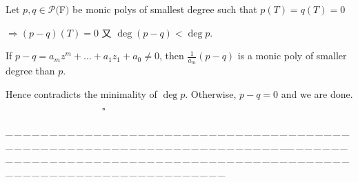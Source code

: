\documentclass[a4paper, 11pt, UTF8]{article}
\def\Po{\mathcal{P}}
\begin{document}
\begin{large}
Let $p,q\in\Po(${\timesbf F}$)$ be monic polys of smallest degree such that $p(T)=q(T) = 0$\par\quad
$\Rightarrow (p-q)(T)=0$ 又 $\deg(p-q)<\deg p$.\par\quad
If $p - q=a_m z^m+\dots+a_1 z_1 +a_0\neq 0$, then $\frac{1}{a_m}(p-q)$ is a monic poly of smaller degree than $p$. \par\quad
Hence contradicts the minimality of $\deg p$. Otherwise, $p-q=0$ and we are done.$\qquad\qquad\qquad\qquad\qquad\square$\par
{\tiny \_\,\_\,\_\,\_\,\_\,\_\,\_\,\_\,\_\,\_\,\_\,\_\,\_\,\_\,\_\,\_\,\_\,\_\,\_\,\_\,\_\,\_\,\_\,\_\,\_\,\_\,\_\,\_\,\_\,\_\,\_\,\_\,\_\,\_\,\_\,\_\,\_\,\_\,\_\,\_\,\_\,\_\,\_\,\_\,\_\,\_\,\_\,\_\,\_\,\_\,\_\,\_\,\_\,\_\,\_\,\_\,\_\,\_\,\_\,\_\,\_\,\_\,\_\,\_\,\_\,\_\,\_\,\_\,\_\,\_\,\_\_\,\_\,\_\,\_\,\_\,\_\,\_\,\_\,\_\,\_\,\_\,\_\,\_\,\_\,\_\,\_\,\_\,\_\,\_\,\_\,\_\,\_\,\_\,\_\,\_\,\_\,\_\,\_\,\_\,\_\,\_\,\_\,\_\,\_\,\_\,\_\,\_\,\_\,\_\,\_\,\_\,\_\,\_\,\_\,\_\,\_\,\_\,\_\,\_\,\_\,\_\,\_\,\_\,\_\,\_\,\_\,\_\,\_\,\_\,\_\,\_\,\_\,\_\,\_\,\_\,\_\,\_\,\_\,\_\,\_\,\_}\par


\end{large}
\end{document}
